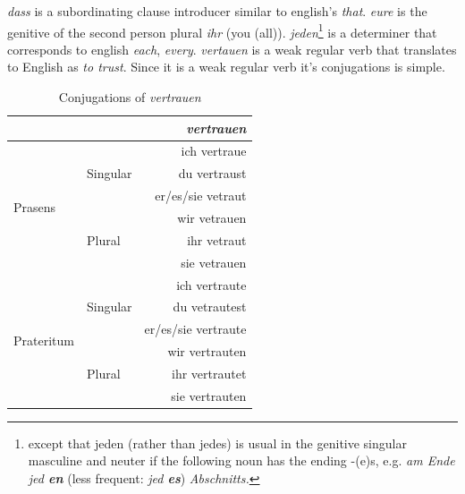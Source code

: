\documentclass[a4paper]{article}
\begin{document}
\emph{dass} is a subordinating clause introducer similar to english's \emph{that}. \emph{eure} is the genitive of the second person 
plural \emph{ihr} (you (all)). \emph{jeden}\footnote{except that jeden (rather than jedes) is usual in the genitive
    singular masculine and neuter if the following noun has the ending -(e)s, e.g.
    \emph{am Ende jed \textbf{en}} (less frequent: \emph{jed \textbf{es}}) \emph{Abschnitts.}} is a determiner that corresponds to
english \emph{each}, \emph{every}. \emph{vertauen} is a weak regular verb that translates to English as \emph{to trust}.
Since it is a weak regular verb it's conjugations is simple.

\begin{table}
    \centering\sffamily
    \begin{tabular}{l l r}
        \toprule
                                    &                           & \emph{vertrauen}    \\
        \midrule
        \multirow{6}{*}{Prasens}    & \multirow{3}{*}{Singular} & ich vertraue        \\
                                    &                           & du vertraust        \\
                                    &                           & er/es/sie vetraut   \\
        \cmidrule{2-3}
                                    & \multirow{3}{*}{Plural}   & wir vetrauen        \\
                                    &                           & ihr vetraut         \\
                                    &                           & sie vetrauen        \\
        \midrule
        \multirow{6}{*}{Prateritum} & \multirow{3}{*}{Singular} & ich vertraute       \\
                                    &                           & du vetrautest       \\
                                    &                           & er/es/sie vertraute \\
        \cmidrule{2-3}
        
                                    & \multirow{3}{*}{Plural}   & wir vertrauten      \\
                                    &                           & ihr vertrautet      \\
                                    &                           & sie vertrauten      \\
        \bottomrule
    \end{tabular}
    \caption{Conjugations of \emph{vertrauen}}
\end{table}
\end{document}
